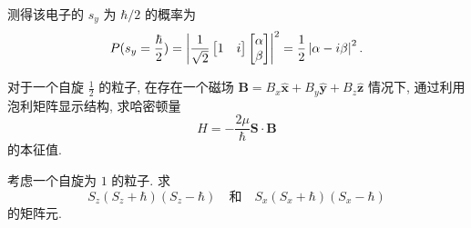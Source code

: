 \documentclass{assignment}
\begin{document}
\begin{sol}
    测得该电子的 $s_y$ 为 $\hbar/2$ 的概率为
    \begin{align}
        P(s_y=\frac{\hbar}{2})=\left\lvert\frac{1}{\sqrt{2}}\begin{bmatrix}
            1&i
        \end{bmatrix}\begin{bmatrix}
            \alpha\\
            \beta
        \end{bmatrix}\right\rvert^2=\frac{1}{2}\left\lvert\alpha-i\beta\right\rvert^2.
    \end{align}
\end{sol}

\begin{prob}[课本习题 3.2]
    对于一个自旋 $\frac{1}{2}$ 的粒子, 在存在一个磁场 $\bm{B}=B_x\hat{\bm{x}}+B_y\hat{\bm{y}}+B_z\hat{\bm{z}}$ 情况下, 通过利用泡利矩阵显示结构, 求哈密顿量
    \[
        H=-\frac{2\mu}{\hbar}\bm{S}\cdot\bm{B}
    \]
    的本征值.
\end{prob}
\begin{sol}
    
\end{sol}

\begin{prob}[课本习题 3.5]
    考虑一个自旋为 $1$ 的粒子. 求
    \[
        S_z(S_z+\hbar)(S_z-\hbar)\quad\text{和}\quad S_x(S_x+\hbar)(S_x-\hbar)
    \]
    的矩阵元.
\end{prob}
\begin{pf}

\end{pf}
\end{document}
